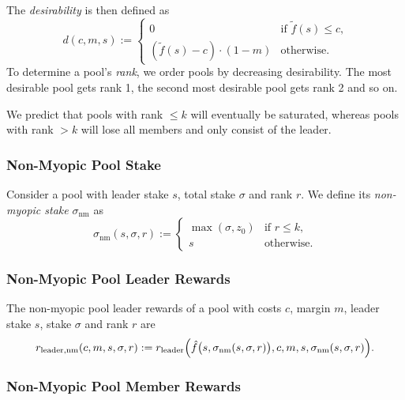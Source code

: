 \documentclass[11pt,a4paper]{article}
\begin{document}
The \emph{desirability} is then defined as \[
    d(c, m, s) :=
    \left\{
    \begin{array}{ll}
        \displaystyle 0 &
        \text{if $\tilde{f}(s)\leq c$,} \\
        \displaystyle\left(\tilde{f}(s) - c\right)\cdot(1-m) &
        \text{otherwise.}
    \end{array}
    \right.
\] To determine a pool's \emph{rank}, we order pools by decreasing
desirability. The most desirable pool gets rank 1, the second most
desirable pool gets rank 2 and so on.

We predict that pools with rank \(\leq k\) will eventually be saturated,
whereas pools with rank \(>k\) will lose all members and only consist of
the leader.

\subsubsection{Non-Myopic Pool Stake}
\label{non-myopic-pool-stake}

Consider a pool with leader stake \(s\), total stake \(\sigma\) and rank
\(r\). We define its \emph{non-myopic stake} \(\sigma_\mathrm{nm}\) as
\[
    \sigma_\mathrm{nm}(s,\sigma,r) :=
    \left\{
    \begin{array}{ll}
        \max(\sigma,z_0) &
        \text{if $r\leq k$,} \\
        s &
        \text{otherwise.}
    \end{array}
    \right.
\]

\subsubsection{Non-Myopic Pool Leader Rewards}
\label{non-myopic-pool-leader-rewards}

The non-myopic pool leader rewards of a pool with costs \(c\), margin
\(m\), leader stake \(s\), stake \(\sigma\) and rank \(r\) are \[
    r_\mathrm{leader, nm}(c, m, s, \sigma, r) :=
    r_\mathrm{leader}\Bigl(\hat{f}\bigl(s,\sigma_\mathrm{nm}(s,\sigma, r)\bigr), c, m, s, \sigma_\mathrm{nm}(s,\sigma,r)\Bigr).
\]

\subsubsection{Non-Myopic Pool Member Rewards}
\label{non-myopic-pool-member-rewards}
\end{document}
